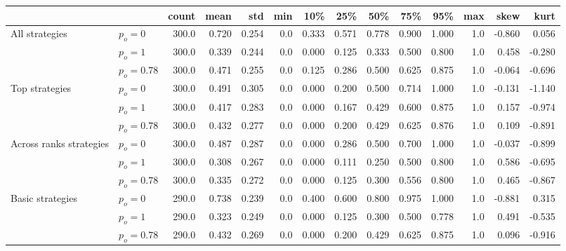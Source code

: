 \begin{tabular}{llrrrrrrrrrrrr}
\toprule
                 &            &  count &   mean &    std &  min &    10\% &    25\% &    50\% &    75\% &    95\% &  max &   skew &   kurt \\
\midrule
\rowcolor{Gray}
All strategies & $p_o=0$ &  300.0 &  0.720 &  0.254 &  0.0 &  0.333 &  0.571 &  0.778 &  0.900 &  1.000 &  1.0 & -0.860 &  0.056 \\
\rowcolor{Gray}
                 & $p_o=1$ &  300.0 &  0.339 &  0.244 &  0.0 &  0.000 &  0.125 &  0.333 &  0.500 &  0.800 &  1.0 &  0.458 & -0.280 \\
\rowcolor{Gray}
                 & $p_o=0.78$ &  300.0 &  0.471 &  0.255 &  0.0 &  0.125 &  0.286 &  0.500 &  0.625 &  0.875 &  1.0 & -0.064 & -0.696 \\
                 \midrule
Top strategies & $p_o=0$ &  300.0 &  0.491 &  0.305 &  0.0 &  0.000 &  0.200 &  0.500 &  0.714 &  1.000 &  1.0 & -0.131 & -1.140 \\
                 & $p_o=1$ &  300.0 &  0.417 &  0.283 &  0.0 &  0.000 &  0.167 &  0.429 &  0.600 &  0.875 &  1.0 &  0.157 & -0.974 \\
                 & $p_o=0.78$ &  300.0 &  0.432 &  0.277 &  0.0 &  0.000 &  0.200 &  0.429 &  0.625 &  0.876 &  1.0 &  0.109 & -0.891 \\
                 \midrule
\rowcolor{Gray}
Across ranks strategies & $p_o=0$ &  300.0 &  0.487 &  0.287 &  0.0 &  0.000 &  0.286 &  0.500 &  0.700 &  1.000 &  1.0 & -0.037 & -0.899 \\
\rowcolor{Gray}
                 & $p_o=1$ &  300.0 &  0.308 &  0.267 &  0.0 &  0.000 &  0.111 &  0.250 &  0.500 &  0.800 &  1.0 &  0.586 & -0.695 \\
\rowcolor{Gray}
                 & $p_o=0.78$ &  300.0 &  0.335 &  0.272 &  0.0 &  0.000 &  0.125 &  0.300 &  0.556 &  0.800 &  1.0 &  0.465 & -0.867 \\
                 \midrule
Basic strategies & $p_o=0$ &  290.0 &  0.738 &  0.239 &  0.0 &  0.400 &  0.600 &  0.800 &  0.975 &  1.000 &  1.0 & -0.881 &  0.315 \\
                 & $p_o=1$ &  290.0 &  0.323 &  0.249 &  0.0 &  0.000 &  0.125 &  0.300 &  0.500 &  0.778 &  1.0 &  0.491 & -0.535 \\
                 & $p_o=0.78$ &  290.0 &  0.432 &  0.269 &  0.0 &  0.000 &  0.200 &  0.429 &  0.625 &  0.875 &  1.0 &  0.096 & -0.916 \\
\bottomrule
\end{tabular}
